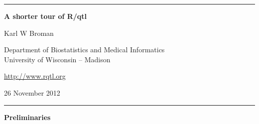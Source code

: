 \documentclass[10pt,letterpaper]{article}
\begin{document}
\begin{center}
\rule{7.0in}{1mm} \vspace{0mm}

{\Large \textbf{A shorter tour of R/qtl}} \vspace{4mm}

{\large Karl W Broman} \vspace{2mm}

Department of Biostatistics and Medical Informatics\\
University of Wisconsin -- Madison

\vspace{2mm}
\href{http://www.rqtl.org}{http://www.rqtl.org}
\vspace{2mm}

26 November 2012 %

\rule{7.0in}{1mm} 
\end{center}



\textbf{Preliminaries} \vspace{6pt}
\end{document}
